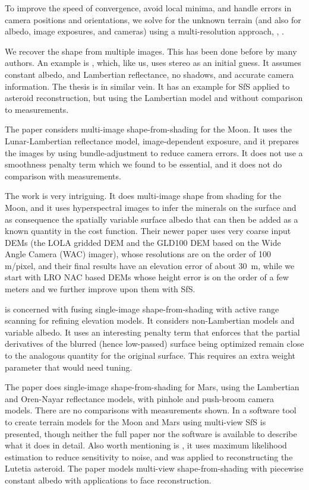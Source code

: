 \documentclass[12pt,oneside]{article}
\begin{document}
To improve the speed of convergence, avoid local minima, and handle
errors in camera positions and orientations, we solve for the unknown
terrain (and also for albedo, image exposures, and cameras) using a
multi-resolution approach, \cite{terzopoulos1984efficient},
\cite{crouzil2003multiresolution}.

We recover the shape from multiple images. This has been done before by
many authors. An example is \cite{wu2011high}, which, like us, uses
stereo as an initial guess. It assumes constant albedo, and Lambertian
reflectance, no shadows, and accurate camera information.  The thesis
\cite{lux2011multi} is in similar vein. It has an example for SfS
applied to asteroid reconstruction, but using the Lambertian model and
without comparison to measurements.

The paper \citet{lohse2006derivation} considers multi-image
shape-from-shading for the Moon. It uses the Lunar-Lambertian reflectance
model, image-dependent exposure, and it prepares the images by using
bundle-adjustment to reduce camera errors. It does not use a smoothness
penalty term which we found to be essential, and it does not do comparison with
measurements.

The work \cite{grumpe2011construction} is very intriguing. It does
multi-image shape from shading for the Moon, and it uses hyperspectral
images to infer the minerals on the surface and as consequence the
spatially variable surface albedo that can then be added as a known
quantity in the cost function. Their newer paper
\cite{grumpe2014construction} uses very coarse input DEMs (the LOLA
gridded DEM and the GLD100 DEM based on the Wide Angle Camera (WAC)
imager), whose resolutions are on the order of 100 m/pixel, and their
final results have an elevation error of about 30~m, while we start with
LRO NAC based DEMs whose height error is on the order of a few meters
and we further improve upon them with SfS.

\cite{herbort2011reconstruction} is concerned with fusing single-image
shape-from-shading with active range scanning for refining elevation
models. It considers non-Lambertian models and variable albedo. It uses
an interesting penalty term that enforces that the partial derivatives
of the blurred (hence low-passed) surface being optimized remain close
to the analogous quantity for the original surface.  This requires an
extra weight parameter that would need tuning.

The paper \cite{o2012new} does single-image shape-from-shading for Mars,
using the Lambertian and Oren-Nayar reflectance models, with pinhole
and push-broom camera models. There are no comparisons with measurements
shown. In \cite{tyler2014merged} a software tool to create terrain models for
the Moon and Mars using multi-view SfS is presented, though neither the
full paper nor the software is available to describe what it does in
detail. Also worth mentioning is \cite{capanna2013three}, it uses
maximum likelihood estimation to reduce sensitivity to noise, and was
applied to reconstructing the Lutetia asteroid. The paper
\cite{samaras2000variable} models multi-view shape-from-shading with
piecewise constant albedo with applications to face reconstruction.
\end{document}
